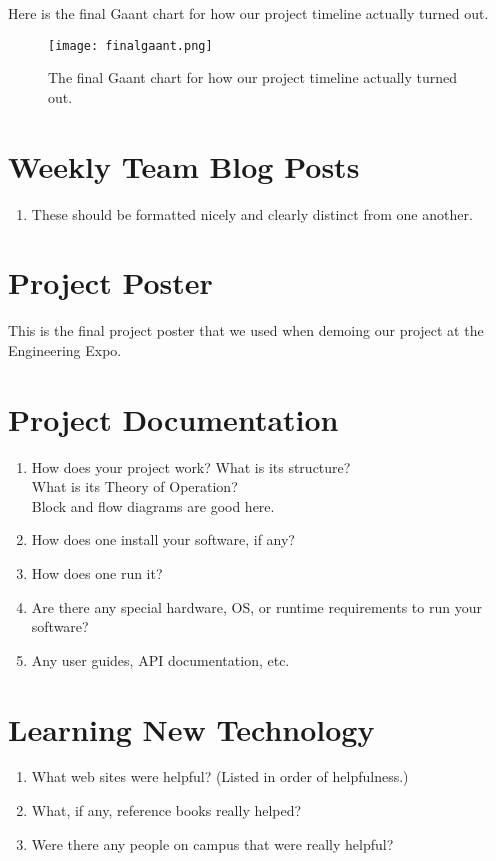 \documentclass[12pt]{article}
\begin{document}
Here is the final Gaant chart for how our project timeline actually turned out.

\begin{figure}[h!]
  \centering
	\texttt{[image: finalgaant.png]}
  \caption{The final Gaant chart for how our project timeline actually turned out.}
\end{figure}


\section{Weekly Team Blog Posts}
\begin{enumerate}
	\item These should be formatted nicely and clearly distinct from one another.
\end{enumerate}

\section{Project Poster}
This is the final project poster that we used when demoing our project at the Engineering Expo.

% 


\section{Project Documentation}
\begin{enumerate}
    \item How does your project work?
    	\subitem What is its structure?\\
    	\subitem What is its Theory of Operation?\\
    	\subitem Block and flow diagrams are good here. 
    \item How does one install your software, if any?
    \item How does one run it?
    \item Are there any special hardware, OS, or runtime requirements to run your software?
    \item Any user guides, API documentation, etc. 
\end{enumerate}

\section{Learning New Technology}
\begin{enumerate}
    \item What web sites were helpful? (Listed in order of helpfulness.)
    \item What, if any, reference books really helped?
    \item Were there any people on campus that were really helpful? 
\end{enumerate}
\end{document}
